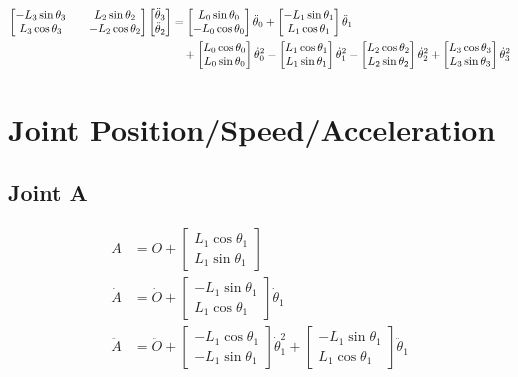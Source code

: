 \documentclass[letterpaper]{article}
\begin{document}
\begin{align}
	\begin{bmatrix} -L_3 \sin \theta_3 && L_2 \sin \theta_2 \\ L_3 \cos \theta_3 && -L_2 \cos \theta_2 \end{bmatrix} \begin{bmatrix} \ddot{\theta}_3 \\ \ddot{\theta}_2 \end{bmatrix} &= \begin{bmatrix} L_0 \sin \theta_0 \\ - L_0 \cos \theta_0 \end{bmatrix} \ddot{\theta}_0 + \begin{bmatrix} -L_1 \sin \theta_1 \\ L_1 \cos \theta_1 \end{bmatrix} \ddot{\theta}_1 \notag \\
		& \quad + \begin{bmatrix} L_0 \cos \theta_0 \\ L_0 \sin \theta_0 \end{bmatrix} \dot{\theta}_0^2- \begin{bmatrix} L_1 \cos \theta_1 \\ L_1 \sin \theta_1 \end{bmatrix} \dot{\theta}_1^2 - \begin{bmatrix} L_2 \cos \theta_2 \\ L_2 \sin \theta_2 \end{bmatrix} \dot{\theta}_2^2 + \begin{bmatrix} L_3 \cos \theta_3 \\ L_3 \sin \theta_3 \end{bmatrix} \dot{\theta}_3^2
\end{align}

\section{Joint Position/Speed/Acceleration}
\subsection{Joint A}

\begin{align}
	A &= O + \begin{bmatrix} L_1 \cos \theta_1 \\ L_1 \sin \theta_1 \end{bmatrix} \\
	\dot{A} &= \dot{O} + \begin{bmatrix} -L_1 \sin \theta_1 \\ L_1 \cos \theta_1 \end{bmatrix} \dot{\theta}_1 \\
	\ddot{A} &= \ddot{O} + \begin{bmatrix} -L_1 \cos \theta_1 \\ -L_1 \sin \theta_1 \end{bmatrix} \dot{\theta}_1^2 + \begin{bmatrix} -L_1 \sin \theta_1 \\ L_1 \cos \theta_1 \end{bmatrix} \ddot{\theta}_1
\end{align}
\end{document}
